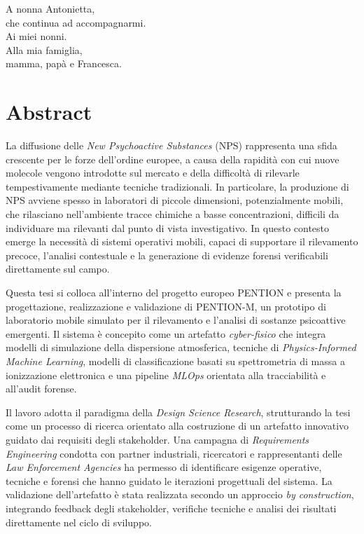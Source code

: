 \documentclass[a4paper, 12pt, oneside]{book}
\begin{document}


\frontmatter

\begin{dedication}
A nonna Antonietta,\\
che continua ad accompagnarmi.\\[1em]

Ai miei nonni.\\[1em]

Alla mia famiglia,\\
mamma, papà e Francesca.
\end{dedication}

\chapter*{Abstract}

La diffusione delle \textit{New Psychoactive Substances} (NPS) rappresenta una sfida crescente per le forze dell’ordine europee, a causa della rapidità con cui nuove molecole vengono introdotte sul mercato e della difficoltà di rilevarle tempestivamente mediante tecniche tradizionali. In particolare, la produzione di NPS avviene spesso in laboratori di piccole dimensioni, potenzialmente mobili, che rilasciano nell’ambiente tracce chimiche a basse concentrazioni, difficili da individuare ma rilevanti dal punto di vista investigativo. In questo contesto emerge la necessità di sistemi operativi mobili, capaci di supportare il rilevamento precoce, l’analisi contestuale e la generazione di evidenze forensi verificabili direttamente sul campo.

Questa tesi si colloca all’interno del progetto europeo \textsc{PENTION} e presenta la progettazione, realizzazione e validazione di \textsc{PENTION-M}, un prototipo di laboratorio mobile simulato per il rilevamento e l’analisi di sostanze psicoattive emergenti. Il sistema è concepito come un artefatto \textit{cyber-fisico} che integra modelli di simulazione della dispersione atmosferica, tecniche di \textit{Physics-Informed Machine Learning}, modelli di classificazione basati su spettrometria di massa a ionizzazione elettronica e una pipeline \textit{MLOps} orientata alla tracciabilità e all’audit forense.

Il lavoro adotta il paradigma della \textit{Design Science Research}, strutturando la tesi come un processo di ricerca orientato alla costruzione di un artefatto innovativo guidato dai requisiti degli stakeholder. Una campagna di \textit{Requirements Engineering} condotta con partner industriali, ricercatori e rappresentanti delle \textit{Law Enforcement Agencies} ha permesso di identificare esigenze operative, tecniche e forensi che hanno guidato le iterazioni progettuali del sistema. La validazione dell’artefatto è stata realizzata secondo un approccio \textit{by construction}, integrando feedback degli stakeholder, verifiche tecniche e analisi dei risultati direttamente nel ciclo di sviluppo.
\end{document}
